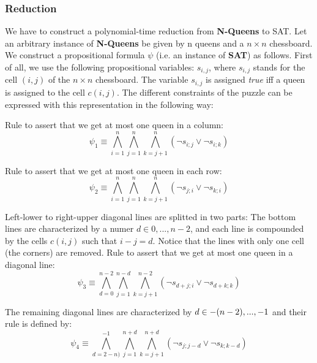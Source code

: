 \documentclass[11pt]{article}
\begin{document}
\subsubsection{Reduction}

We have to construct a polynomial-time reduction from \textbf{N-Queens} to
SAT. Let an arbitrary instance of \textbf{N-Queens} be given by n queens and
a $n\times n$ chessboard. We construct a propositional formula $\psi $ (i.e.
an instance of \textbf{SAT}) as follows.\newline
First of all, we use the following propositional variables: $s_{i,j}$, where 
$s_{i,j}$ stands for the cell $(i,j)$ of the $n\times n$ chessboard. The
variable $s_{i,j}$ is assigned \textit{true} iff a queen is assigned to the
cell $c(i,j)$. The different constraints of the puzzle can be expressed with
this representation in the following way:

\noindent Rule to assert that we get at most one queen in a column: 
\begin{equation*}
\psi_1 \equiv
\bigwedge_{i=1}^{n}\bigwedge_{j=1}^{n}\bigwedge_{k=j+1}^{n}(\neg s_{i;j}
\vee \neg s_{i;k})
\end{equation*}

\noindent Rule to assert that we get at most one queen in each row: 
\begin{equation*}
\psi_2 \equiv
\bigwedge_{i=1}^{n}\bigwedge_{j=1}^{n}\bigwedge_{k=j+1}^{n}(\neg s_{j;i}
\vee \neg s_{k;i})
\end{equation*}

\noindent Left-lower to right-upper diagonal lines are splitted in two
parts: The bottom lines are characterized by a numer $d\in {0,...,n-2}$, and
each line is compounded by the cells $c(i,j)$ such that $i-j=d$. Notice that
the lines with only one cell (the corners) are removed.\newline
Rule to assert that we get at most one queen in a diagonal line: 
\begin{equation*}
\psi _{3}\equiv
\bigwedge_{d=0}^{n-2}\bigwedge_{j=1}^{n-d}\bigwedge_{k=j+1}^{n-2}(\lnot
s_{d+j;i}\vee \lnot s_{d+k;k})
\end{equation*}

\noindent The remaining diagonal lines are characterized by $d \in {%
-(n-2),...,-1}$ and their rule is defined by: 
\begin{equation*}
\psi_4 \equiv
\bigwedge_{d=2-n)}^{-1}\bigwedge_{j=1}^{n+d}\bigwedge_{k=j+1}^{n+d}(\neg
s_{j;j-d} \vee \neg s_{k;k-d})
\end{equation*}
\end{document}
